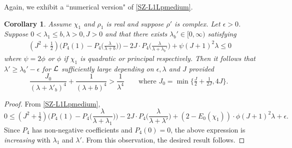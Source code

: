 \documentclass[12pt,psamsfonts]{amsart}
\newtheorem{cor}[thm]{Corollary}
\theoremstyle{definition}
\theoremstyle{remark}
\numberwithin{equation}{section}
\begin{document}
Again, we exhibit a ``numerical version" of \cref{SZ-L1Lpmedium}.
\begin{cor} \label{SZ-L1Lpmedium-Numerical} Assume $\chi_1$ and $\rho_1$ is real and suppose $\rho'$ is complex. Let $\epsilon > 0$. Suppose $0 < \lambda_1 \leq b, \lambda > 0, J > 0$ and that there exists $\lambda_b' \in [0,\infty)$ satisfying
\begin{align*}
 (J^2 + \tfrac{1}{2}) \big( P_4(1) - P_4\big( \frac{\lambda}{\lambda+ b} \big) \big) - 2J \cdot P_4\big( \frac{\lambda}{\lambda+\lambda_b'} \big)  + \psi (J+1)^2 \lambda \leq 0
\end{align*}
where $\psi = 2\phi$ or $\phi$ if $\chi_1$ is quadratic or principal respectively. Then it follows that $\lambda' \geq \lambda_b' - \epsilon$ for $\mathcal{L}$ sufficiently large depending on $\epsilon, \lambda$ and $J$ provided
\[
\frac{J_0}{(\lambda+\lambda'_b)^4} + \frac{1}{(\lambda+b)^4} > \frac{1}{\lambda^4} \qquad \text{where $J_0 = \min\{ \tfrac{J}{2} + \tfrac{1}{2J}, 4J\}$. }
\] 
\end{cor}
\begin{proof} 
From \cref{SZ-L1Lpmedium}, 
\[
0 \leq (J^2 + \tfrac{1}{2}) \big( P_4(1) - P_4\big( \frac{\lambda}{\lambda+ \lambda_1} \big) \big) - 2J \cdot P_4\big( \frac{\lambda}{\lambda+\lambda'} \big)  + (2-E_0(\chi_1)) \cdot \phi (J+1)^2 \lambda + \epsilon.
\]
Since $P_4$ has non-negative coefficients and $P_4(0) = 0$, the above expression is \emph{increasing} with $\lambda_1$ and $\lambda'$. From this observation, the desired result follows. 
\end{proof}
\end{document}

